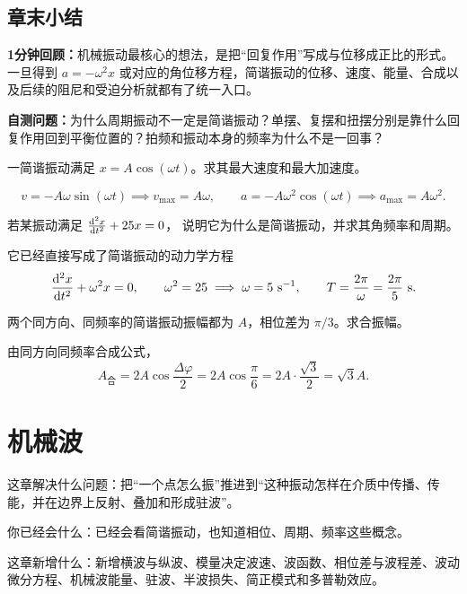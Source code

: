 \documentclass[lang=cn,11pt]{elegantbook}
\newcommand{\chapterroadmap}[3]{%
\begin{introduction}
  \item {\heiti 这章解决什么问题：}#1
  \item {\heiti 你已经会什么：}#2
  \item {\heiti 这章新增什么：}#3
\end{introduction}}
\newcommand{\summaryline}[1]{\par\noindent\textbf{1分钟回顾：}#1\par}
\newcommand{\chapterselfcheck}[1]{\par\noindent\textbf{自测问题：}#1\par}
\begin{document}
\section{章末小结}

\summaryline{机械振动最核心的想法，是把“回复作用”写成与位移成正比的形式。一旦得到 \(a=-\omega^2x\) 或对应的角位移方程，简谐振动的位移、速度、能量、合成以及后续的阻尼和受迫分析就都有了统一入口。}
\chapterselfcheck{为什么周期振动不一定是简谐振动？单摆、复摆和扭摆分别是靠什么回复作用回到平衡位置的？拍频和振动本身的频率为什么不是一回事？}

\begin{exercise}[]
一简谐振动满足 \(x=A\cos(\omega t)\)。求其最大速度和最大加速度。
\end{exercise}

\begin{solution}
\[
v=-A\omega\sin(\omega t)\implies v_{\max}=A\omega,\qquad
a=-A\omega^2\cos(\omega t)\implies a_{\max}=A\omega^2.
\]
\end{solution}

\begin{exercise}[]
若某振动满足 \(\dv[2]{x}{t}+25x=0\)，
说明它为什么是简谐振动，并求其角频率和周期。
\end{exercise}

\begin{solution}
它已经直接写成了简谐振动的动力学方程
\[
\dv[2]{x}{t}+\omega^2x=0,\qquad
\omega^2=25
\implies
\omega=5\ \text{s}^{-1},\qquad
T=\frac{2\pi}{\omega}=\frac{2\pi}{5}\ \text{s}.
\]
\end{solution}

\begin{exercise}[]
两个同方向、同频率的简谐振动振幅都为 \(A\)，相位差为 \(\pi/3\)。求合振幅。
\end{exercise}

\begin{solution}
由同方向同频率合成公式，
\[
A_{\text{合}}=2A\cos\frac{\Delta\varphi}{2}
=2A\cos\frac{\pi}{6}
=2A\cdot \frac{\sqrt{3}}{2}
=\sqrt{3}A.
\]
\end{solution}

\chapter{机械波}

\chapterroadmap
{把“一个点怎么振”推进到“这种振动怎样在介质中传播、传能，并在边界上反射、叠加和形成驻波”。}
{已经会看简谐振动，也知道相位、周期、频率这些概念。}
{新增横波与纵波、模量决定波速、波函数、相位差与波程差、波动微分方程、机械波能量、驻波、半波损失、简正模式和多普勒效应。}
\end{document}
